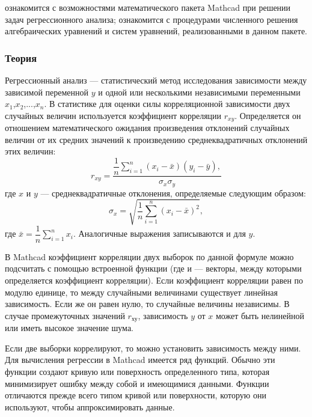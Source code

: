 
\goal ознакомится с возможностями математического пакета Mathcad при решении задач регрессионного анализа; ознакомится с процедурами численного решения алгебраических уравнений и систем уравнений, реализованными в данном пакете. 

\subsubsection*{Теория}
Регрессионный анализ --- статистический метод исследования зависимости между зависимой переменной $y$ и одной или несколькими независимыми переменными $x_1$,$x_2$,...,$x_n$.
В статистике для оценки силы корреляционной зависимости двух случайных величин используется коэффициент корреляции $r_{xy}$. Определяется он отношением математического ожидания произведения отклонений случайных величин от их средних значений к произведению среднеквадратичных отклонений этих величин:
\begin{equation}
	r_{xy}=\dfrac{\dfrac{1}{n} \sum\limits_{i=1}^{n} (x_i-\bar{x}) (y_i-\bar{y}), }{\sigma_x \sigma_y}
\end{equation}
где $x$ и $y$ --- среднеквадратичные отклонения, определяемые следующим образом:
\begin{equation}
	\sigma_x=\sqrt{\dfrac{1}{n} \sum\limits_{i=1}^{n}(x_i-\bar{x})^2},
\end{equation}
где $\bar{x}=\dfrac{1}{n} \sum\limits_{i=1}^{n} x_i$.
Аналогичные выражения записываются и для $y$.

В Mathcad коэффициент корреляции двух выборок по данной формуле можно подсчитать с помощью встроенной функции  (где  и  --- векторы, между которыми определяется коэффициент корреляции). Если коэффициент корреляции равен по модулю единице, то между случайными величинами существует линейная зависимость. Если же он равен нулю, то случайные величины независимы. В случае промежуточных значений $r_{ху}$, зависимость $y$ от $x$ может быть нелинейной или иметь высокое значение шума.

Если две выборки коррелируют, то можно установить зависимость между ними. Для вычисления регрессии в Mathcad имеется ряд функций. Обычно эти функции создают кривую или поверхность определенного типа, которая минимизирует ошибку между собой и имеющимися данными. Функции отличаются прежде всего типом кривой или поверхности, которую они используют, чтобы аппроксимировать данные.


